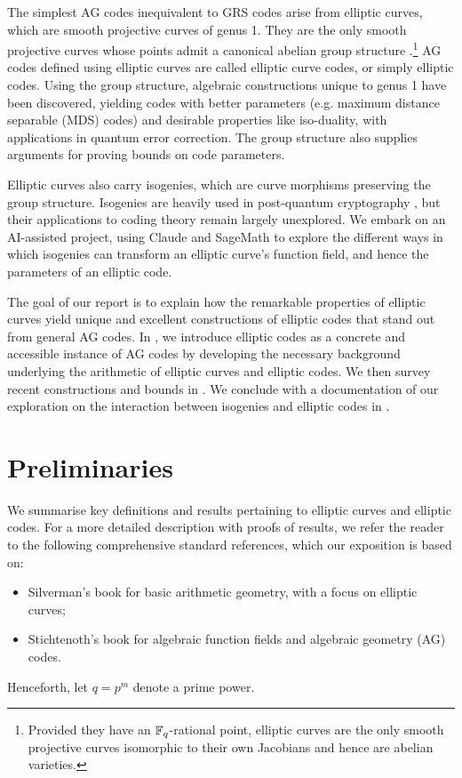 \documentclass[twocolumn, 11pt]{scrartcl}
\begin{document}
The simplest AG codes inequivalent to GRS codes arise from elliptic curves, which are smooth projective curves of genus 1. They are the only smooth projective curves whose points admit a canonical abelian group structure \cite[\S X.3]{silverman2009arithmetic}.\footnote{Provided they have an $\mathbb{F}_q$-rational point, elliptic curves are the only smooth projective curves isomorphic to their own Jacobians and hence are abelian varieties.} AG codes defined using elliptic curves are called elliptic curve codes, or simply elliptic codes. Using the group structure, algebraic constructions unique to genus 1 have been discovered, yielding codes with better parameters (e.g. maximum distance separable (MDS) codes) and desirable properties like iso-duality, with applications in quantum error correction. The group structure also supplies arguments for proving bounds on code parameters.

Elliptic curves also carry isogenies, which are curve morphisms preserving the group structure. Isogenies are heavily used in post-quantum cryptography \cite{jamielow2027,basso2026prism,NISTPQC-ADD-R3:SQIsign26}, but their applications to coding theory remain largely unexplored. We embark on an AI-assisted project, using Claude and SageMath to explore the different ways in which isogenies can transform an elliptic curve's function field, and hence the parameters of an elliptic code.

The goal of our report is to explain how the remarkable properties of elliptic curves yield unique and excellent constructions of elliptic codes that stand out from general AG codes. In , we introduce elliptic codes as a concrete and accessible instance of AG codes by developing the necessary background underlying the arithmetic of elliptic curves and elliptic codes. We then survey recent constructions and bounds in . We conclude with a documentation of our exploration on the interaction between isogenies and elliptic codes in .

\section{Preliminaries} \label{section:preliminaries}

We summarise key definitions and results pertaining to elliptic curves and elliptic codes. For a more detailed description with proofs of results, we refer the reader to the following comprehensive standard references, which our exposition is based on:
\begin{itemize}
    \item Silverman's book \cite{silverman2009arithmetic} for basic arithmetic geometry, with a focus on elliptic curves;
    \item Stichtenoth's book \cite{stichtenoth2009algebraic} for algebraic function fields and algebraic geometry (AG) codes.
\end{itemize}
Henceforth, let $q=p^m$ denote a prime power.
\end{document}
